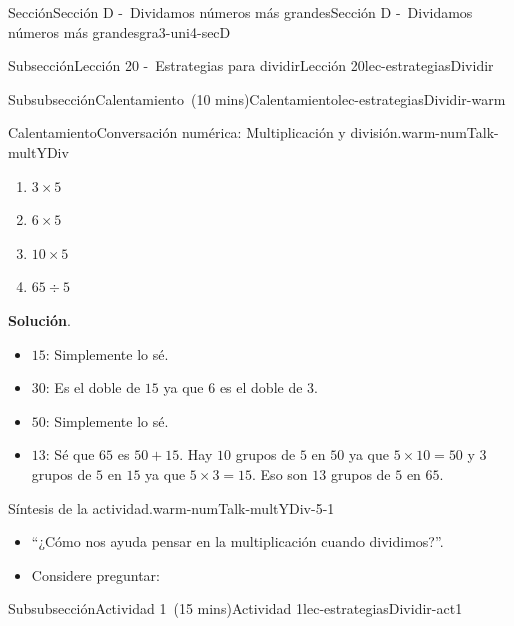 \documentclass[oneside,10pt,]{article}
\newcommand{\blocktitlefont}{\relax}
\newlength{\fillinmaxwidth}
\newlength{\fillincontract}
\newlength{\charmaxwidth}\setlength{\charmaxwidth}{0.5em}
\newlength{\charminwidth}\setlength{\charminwidth}{0.1em}
\newlength{\fillinheight}
\newcommand{\fillintext}[1]{%
\setlength{\fillinmaxwidth}{#1\charmaxwidth}%
\setlength{\fillincontract}{#1\charminwidth}%
\setlength{\fillinheight}{\baselineskip}\addtolength{\fillinheight}{1.2pt}%
\strut\nobreak\leaders\vbox{\hrule width 0.3pt height 0.3pt \vskip -1.2pt}\hskip 1\fillinmaxwidth minus \fillincontract\nobreak\strut%
}
\begin{document}
\begin{sectionptx}{Sección}{Sección D -~Dividamos números más grandes}{}{Sección D -~Dividamos números más grandes}{}{}{gra3-uni4-secD}
\begin{subsectionptx}{Subsección}{Lección 20 -~Estrategias para dividir}{}{Lección 20}{}{}{lec-estrategiasDividir}
\begin{subsubsectionptx}{Subsubsección}{Calentamiento~(10 mins)}{}{Calentamiento}{}{}{lec-estrategiasDividir-warm}
\begin{exploration}{Calentamiento}{Conversación numérica: Multiplicación y división.}{warm-numTalk-multYDiv}
\begin{enumerate}[label={\Alph*.}]
\item{}\(\displaystyle 3\times 5\)%
\item{}\(\displaystyle 6\times 5\)%
\item{}\(\displaystyle 10\times 5\)%
\item{}\(\displaystyle 65\div 5\)%
\end{enumerate}
\par\smallskip%
\noindent\textbf{\blocktitlefont Solución}.\hypertarget{warm-numTalk-multYDiv-3}{}\quad{}%
\begin{itemize}[label=\textbullet]
\item{}\(15\): Simplemente lo sé.%
\item{}\(30\): Es el doble de \(15\) ya que \(6\) es el doble de \(3\).%
\item{}\(50\): Simplemente lo sé.%
\item{}\(13\): Sé que \(65\) es \(50 + 15\). Hay \(10\) grupos de \(5\) en \(50\) ya que \(5 \times 10 = 50\) y \(3\) grupos de \(5\) en \(15\) ya que \(5 \times 3 = 15\). Eso son \(13\) grupos de \(5\) en \(65\).%
\end{itemize}
\end{exploration}%
\par
\begin{paragraphs}{Síntesis de la actividad.}{warm-numTalk-multYDiv-5-1}%
%
\begin{itemize}[label=\textbullet]
\item{}``¿Cómo nos ayuda pensar en la multiplicación cuando dividimos?''.%
\item{}Considere preguntar:%
%
\end{itemize}
\end{paragraphs}%
\end{subsubsectionptx}
%
%
\typeout{************************************************}
\typeout{************************************************}
%
\begin{subsubsectionptx}{Subsubsección}{Actividad 1~(15 mins)}{}{Actividad 1}{}{}{lec-estrategiasDividir-act1}

\end{subsubsectionptx}
\end{subsectionptx}
\end{sectionptx}
\end{document}

